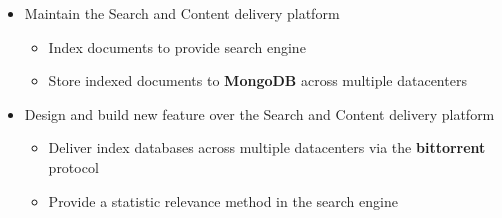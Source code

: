 \documentclass[11pt, a4paper]{moderncv}
\begin{document}
{
  \begin{itemize}
    \renewcommand{\labelitemi}{$\bullet$  }
    \item Maintain the Search and Content delivery platform
      \begin{itemize}
        \item Index documents to provide search engine
        \item Store indexed documents to \textbf{MongoDB} across multiple
          datacenters
      \end{itemize}
    \item Design and build new feature over the Search and Content delivery platform
      \begin{itemize}
        \item Deliver index databases across multiple datacenters via the
          \textbf{bittorrent} protocol
        \item Provide a statistic relevance method in the search engine
      \end{itemize}
  \end{itemize}
}
\end{document}
